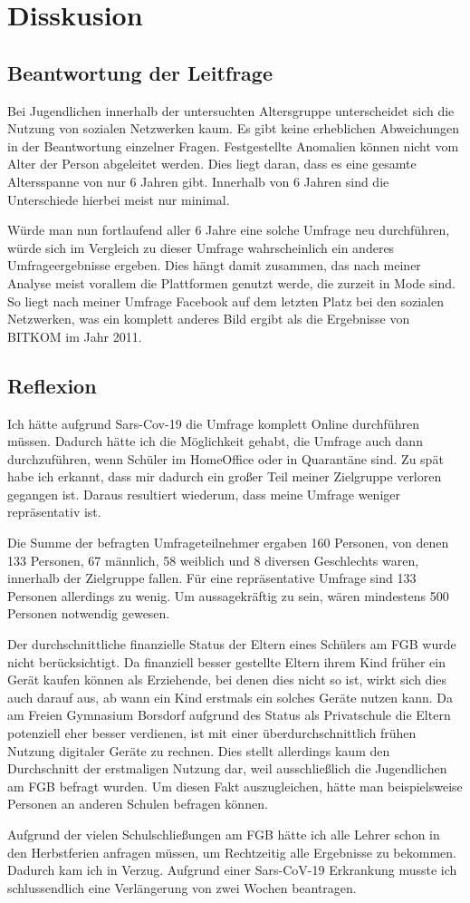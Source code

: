 \section{Disskusion}

\subsection{Beantwortung der Leitfrage}

Bei Jugendlichen innerhalb der untersuchten Altersgruppe unterscheidet sich die Nutzung von sozialen Netzwerken kaum. Es gibt keine erheblichen Abweichungen in der Beantwortung einzelner Fragen. Festgestellte Anomalien  können nicht vom Alter der Person abgeleitet werden. Dies liegt daran, dass es eine gesamte Altersspanne von nur 6 Jahren gibt. Innerhalb von 6 Jahren sind die Unterschiede hierbei meist nur minimal.

Würde man nun fortlaufend aller 6 Jahre eine solche Umfrage neu durchführen, würde sich im Vergleich zu dieser Umfrage wahrscheinlich ein anderes Umfrageergebnisse ergeben. Dies hängt damit zusammen, das nach meiner Analyse meist vorallem die Plattformen genutzt werde, die zurzeit in Mode sind. So liegt nach meiner Umfrage Facebook auf dem letzten Platz bei den sozialen Netzwerken, was ein komplett anderes Bild ergibt als die Ergebnisse von BITKOM im Jahr 2011.

\subsection{Reflexion}

Ich hätte aufgrund Sars-Cov-19 die Umfrage komplett Online durchführen müssen. Dadurch hätte ich die Möglichkeit gehabt, die Umfrage auch dann durchzuführen, wenn Schüler im HomeOffice oder in Quarantäne sind. Zu spät habe ich erkannt, dass mir dadurch ein großer Teil meiner Zielgruppe verloren gegangen ist. Daraus resultiert wiederum, dass meine Umfrage weniger repräsentativ ist.

Die Summe der befragten Umfrageteilnehmer ergaben 160 Personen, von denen 133 Personen, 67 männlich, 58 weiblich und 8 diversen Geschlechts waren, innerhalb der Zielgruppe fallen. Für eine repräsentative Umfrage sind 133 Personen allerdings zu wenig. Um aussagekräftig zu sein, wären
mindestens 500 Personen notwendig gewesen.

Der durchschnittliche finanzielle Status der Eltern eines Schülers am FGB wurde nicht berücksichtigt. Da finanziell besser gestellte Eltern ihrem Kind früher ein Gerät kaufen können als Erziehende, bei denen dies nicht so ist, wirkt sich dies auch darauf aus, ab wann ein Kind erstmals ein solches Geräte nutzen kann. Da am Freien Gymnasium Borsdorf aufgrund des Status als Privatschule die Eltern potenziell eher besser verdienen, ist mit einer überdurchschnittlich frühen Nutzung digitaler Geräte zu rechnen. Dies stellt allerdings kaum den Durchschnitt der erstmaligen Nutzung dar, weil ausschließlich die Jugendlichen am FGB befragt wurden. Um diesen Fakt auszugleichen, hätte man beispielsweise Personen an anderen Schulen befragen können.

Aufgrund der vielen Schulschließungen am FGB hätte ich alle Lehrer schon in den Herbstferien anfragen müssen, um Rechtzeitig alle Ergebnisse zu bekommen. Dadurch kam ich in Verzug. Aufgrund einer Sars-CoV-19 Erkrankung musste ich schlussendlich eine Verlängerung von zwei Wochen beantragen.